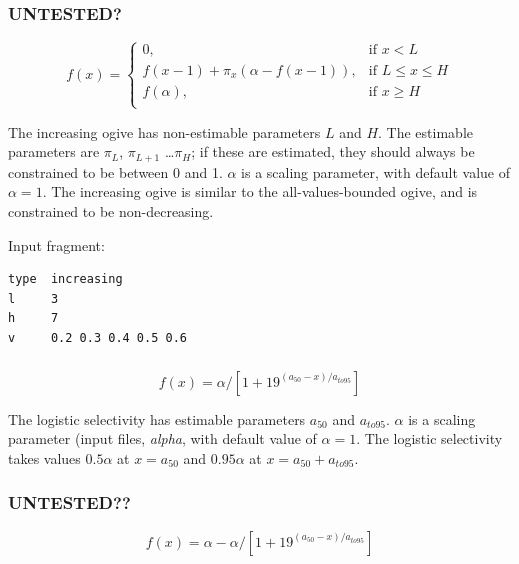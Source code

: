 \subsubsection[Increasing ]{ UNTESTED?}

\begin{equation}
f(x)=\begin{cases}
	  0, & \text{if $x < L$} \\
	  f(x-1)+ \pi_x(\alpha-f(x-1)), & \text{if $L \le x \le H$} \\
	  f(\alpha), & \text{if $x \ge H$} \\
  \end{cases}
\end{equation}

The increasing ogive has non-estimable parameters $L$ and $H$. The estimable parameters are $\pi_L$, $\pi_{L+1}$ \ldots $\pi_H$; if these are estimated, they should always be constrained to be between 0 and 1. $\alpha$ is a scaling parameter, with default value of $\alpha = 1$. The increasing ogive is similar to the all-values-bounded ogive, and is constrained to be non-decreasing.

Input fragment: {\small{\begin{verbatim}
type  increasing
l     3
h     7
v     0.2 0.3 0.4 0.5 0.6

\end{verbatim}}}
\subsubsection[Logistic]{}

\begin{equation}
  f(x) = \alpha / [1+19^{(a_{50}-x)/a_{to95}}]
\end{equation}

The logistic selectivity has estimable parameters $a_{50}$ and $a_{to95}$. $\alpha$ is a scaling parameter (input files, \textit{alpha}, with default value of $\alpha = 1$. The logistic selectivity takes values $0.5 \alpha$ at $x=a_{50}$ and $0.95 \alpha$ at $x=a_{50}+a_{to95}$.

\subsubsection[Inverse logistic]{ UNTESTED??}

\begin{equation}
  f(x) = \alpha - \alpha / [1+19^{(a_{50}-x)/a_{to95}}]
\end{equation}

